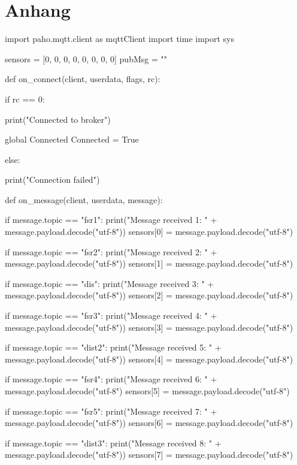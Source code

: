 \chapter{Anhang}
\label{cha:anh}

\begin{python}
import paho.mqtt.client as mqttClient
import time
import sys

sensors = [0, 0, 0, 0, 0, 0, 0, 0]
pubMsg = ""

def on_connect(client, userdata, flags, rc):

    if rc == 0:

        print("Connected to broker")

        global Connected                
        Connected = True                

    else:

        print("Connection failed")

def on_message(client, userdata, message):

    if message.topic == "fsr1":
        print("Message received 1: "  + 
               message.payload.decode("utf-8"))
        sensors[0] = message.payload.decode("utf-8")

    if message.topic == "fsr2":
        print("Message received 2: "  + 
               message.payload.decode("utf-8"))
        sensors[1] = message.payload.decode("utf-8")

    if message.topic == "dis":
        print("Message received 3: "  + 
               message.payload.decode("utf-8"))
        sensors[2] = message.payload.decode("utf-8")

    if message.topic == "fsr3":
        print("Message received 4: "  + 
               message.payload.decode("utf-8"))
        sensors[3] = message.payload.decode("utf-8")

    if message.topic == "dist2":
        print("Message received 5: "  + 
               message.payload.decode("utf-8"))
        sensors[4] = message.payload.decode("utf-8")

    if message.topic == "fsr4":
        print("Message received 6: "  +
               message.payload.decode("utf-8")
        sensors[5] = message.payload.decode("utf-8")

    if message.topic == "fsr5":
        print("Message received 7: "  + 
               message.payload.decode("utf-8"))
        sensors[6] = message.payload.decode("utf-8")


    if message.topic == "dist3":
        print("Message received 8: "  + 
               message.payload.decode("utf-8"))
        sensors[7] = message.payload.decode("utf-8")


\end{python}
